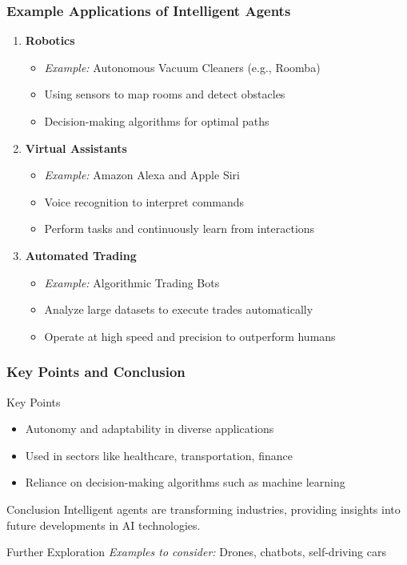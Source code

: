 \documentclass[aspectratio=169]{beamer}
\begin{document}
\begin{frame}[fragile]
    \frametitle{Example Applications of Intelligent Agents}
    \begin{enumerate}
        \item \textbf{Robotics}
            \begin{itemize}
                \item \textit{Example:} Autonomous Vacuum Cleaners (e.g., Roomba)
                \item Using sensors to map rooms and detect obstacles
                \item Decision-making algorithms for optimal paths
            \end{itemize}

        \item \textbf{Virtual Assistants}
            \begin{itemize}
                \item \textit{Example:} Amazon Alexa and Apple Siri
                \item Voice recognition to interpret commands
                \item Perform tasks and continuously learn from interactions
            \end{itemize}

        \item \textbf{Automated Trading}
            \begin{itemize}
                \item \textit{Example:} Algorithmic Trading Bots
                \item Analyze large datasets to execute trades automatically
                \item Operate at high speed and precision to outperform humans
            \end{itemize}
    \end{enumerate}
\end{frame}

\begin{frame}[fragile]
    \frametitle{Key Points and Conclusion}
    \begin{block}{Key Points}
        \begin{itemize}
            \item Autonomy and adaptability in diverse applications
            \item Used in sectors like healthcare, transportation, finance
            \item Reliance on decision-making algorithms such as machine learning
        \end{itemize}
    \end{block}
    \begin{block}{Conclusion}
        Intelligent agents are transforming industries, providing insights into future developments in AI technologies.
    \end{block}
    \begin{block}{Further Exploration}
        \textit{Examples to consider:} Drones, chatbots, self-driving cars
    \end{block}
\end{frame}
\end{document}
